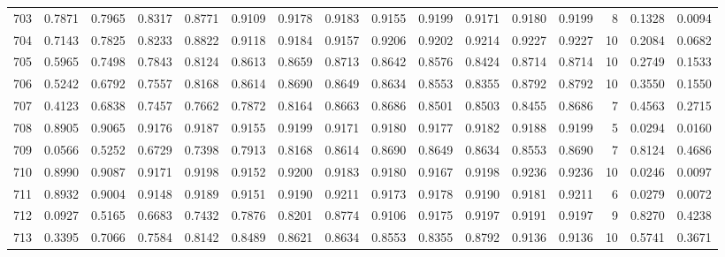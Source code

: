 \begin{tabular}{lrrrrrrrrrrrrrrr}
703 &      0.7871 &  0.7965 &  0.8317 &  0.8771 &  0.9109 &  0.9178 &  0.9183 &  0.9155 &  0.9199 &  0.9171 &   0.9180 &     0.9199 &      8 &                    0.1328 &                     0.0094 \\
704 &      0.7143 &  0.7825 &  0.8233 &  0.8822 &  0.9118 &  0.9184 &  0.9157 &  0.9206 &  0.9202 &  0.9214 &   0.9227 &     0.9227 &     10 &                    0.2084 &                     0.0682 \\
705 &      0.5965 &  0.7498 &  0.7843 &  0.8124 &  0.8613 &  0.8659 &  0.8713 &  0.8642 &  0.8576 &  0.8424 &   0.8714 &     0.8714 &     10 &                    0.2749 &                     0.1533 \\
706 &      0.5242 &  0.6792 &  0.7557 &  0.8168 &  0.8614 &  0.8690 &  0.8649 &  0.8634 &  0.8553 &  0.8355 &   0.8792 &     0.8792 &     10 &                    0.3550 &                     0.1550 \\
707 &      0.4123 &  0.6838 &  0.7457 &  0.7662 &  0.7872 &  0.8164 &  0.8663 &  0.8686 &  0.8501 &  0.8503 &   0.8455 &     0.8686 &      7 &                    0.4563 &                     0.2715 \\
708 &      0.8905 &  0.9065 &  0.9176 &  0.9187 &  0.9155 &  0.9199 &  0.9171 &  0.9180 &  0.9177 &  0.9182 &   0.9188 &     0.9199 &      5 &                    0.0294 &                     0.0160 \\
709 &      0.0566 &  0.5252 &  0.6729 &  0.7398 &  0.7913 &  0.8168 &  0.8614 &  0.8690 &  0.8649 &  0.8634 &   0.8553 &     0.8690 &      7 &                    0.8124 &                     0.4686 \\
710 &      0.8990 &  0.9087 &  0.9171 &  0.9198 &  0.9152 &  0.9200 &  0.9183 &  0.9180 &  0.9167 &  0.9198 &   0.9236 &     0.9236 &     10 &                    0.0246 &                     0.0097 \\
711 &      0.8932 &  0.9004 &  0.9148 &  0.9189 &  0.9151 &  0.9190 &  0.9211 &  0.9173 &  0.9178 &  0.9190 &   0.9181 &     0.9211 &      6 &                    0.0279 &                     0.0072 \\
712 &      0.0927 &  0.5165 &  0.6683 &  0.7432 &  0.7876 &  0.8201 &  0.8774 &  0.9106 &  0.9175 &  0.9197 &   0.9191 &     0.9197 &      9 &                    0.8270 &                     0.4238 \\
713 &      0.3395 &  0.7066 &  0.7584 &  0.8142 &  0.8489 &  0.8621 &  0.8634 &  0.8553 &  0.8355 &  0.8792 &   0.9136 &     0.9136 &     10 &                    0.5741 &                     0.3671 \\

\end{tabular}

